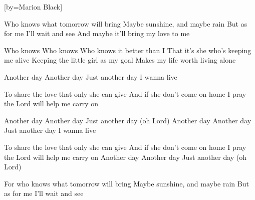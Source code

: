 [by={Marion Black}]


  \chordsoff

  \beginverse
  Who knows what tomorrow will bring
  Maybe sunshine, and maybe rain
  But as for me I'll wait and see
  And maybe it'll bring my love to me
  \endverse

  \beginverse
  Who knows
  Who knows
  Who knows it better than I
  That it's she who's keeping me alive
  Keeping the little girl as my goal
  Makes my life worth living alone
  \endverse

  \beginverse
  Another day
  Another day
  Just another day
  I wanna live
  \endverse

  \beginverse
  To share the love that only she can give
  And if she don't come on home
  I pray the Lord will help me carry on
  \endverse

  \beginverse
  Another day
  Another day
  Just another day (oh Lord)
  Another day
  Another day
  Just another day
  I wanna live
  \endverse

  \beginverse
  To share the love that only she can give
  And if she don't come on home
  I pray the Lord will help me carry on
  Another day
  Another day
  Just another day (oh Lord)
  \endverse

  \beginverse
  For who knows what tomorrow will bring
  Maybe sunshine, and maybe rain
  But as for me I'll wait and see
  \endverse
\endsong
